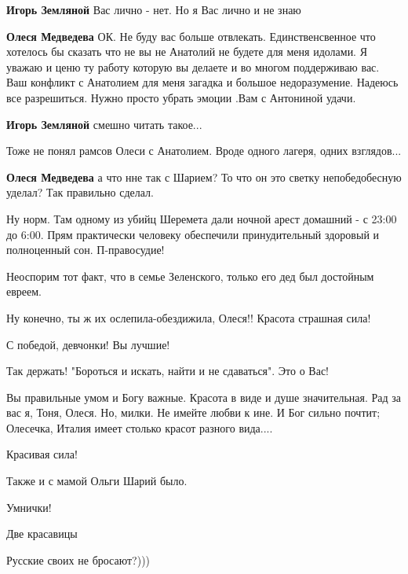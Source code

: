 \begin{itemize}
\begin{itemize}
\textbf{Игорь Земляной} Вас лично - нет. Но я Вас лично и не знаю

\textbf{Олеся Медведева} ОК. Не буду вас больше отвлекать. Единственсвенное что
хотелось бы сказать что не вы не Анатолий не будете для меня идолами. Я уважаю и
ценю ту работу которую вы делаете и во многом поддерживаю вас. Ваш конфликт с
Анатолием для меня загадка и большое недоразумение. Надеюсь все
разрешиться. Нужно просто убрать эмоции .Вам с Антониной удачи.

\textbf{Игорь Земляной} смешно читать такое...

Тоже не понял рамсов Олеси с Анатолием. Вроде одного лагеря, одних взглядов...

\textbf{Олеся Медведева} а что нне так с Шарием? То что он это светку непобедобесную уделал? Так правильно сделал.
\end{itemize} %


Ну норм. Там одному из убийц Шеремета дали ночной арест домашний - с 23:00 до
6:00. Прям практически человеку обеспечили принудительный здоровый и
полноценный сон. П-правосудие!

Неоспорим тот факт, что в семье Зеленского, только его дед был достойным евреем.

Ну конечно, ты ж их ослепила-обездижила, Олеся!! Красота страшная сила!

С победой, девчонки! Вы лучшие!

Так держать! "Бороться и искать, найти и не сдаваться". Это о Вас!


Вы правильные умом и Богу важные. Красота в виде и душе значительная. Рад за
вас я, Тоня, Олеся. Но, милки. Не имейте любви к ине. И Бог сильно почтит;
Олесечка, Италия имеет столько красот разного вида....

Красивая сила!

Также и с мамой Ольги Шарий было.

Умнички!

Две красавицы

Русские своих не бросают?)))

\end{itemize} %

